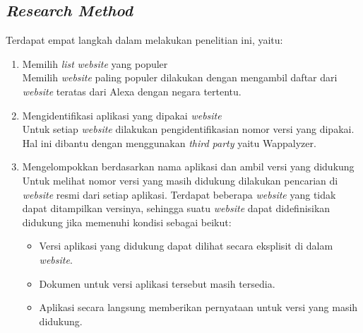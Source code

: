 \subsection{\textit{Research Method}}
Terdapat empat langkah dalam melakukan penelitian ini, yaitu:
\begin{enumerate}
    \item Memilih \textit{list} \textit{website} yang populer\\
    Memilih \textit{website} paling populer dilakukan dengan mengambil daftar dari \textit{website} teratas dari Alexa dengan negara tertentu.
    \item Mengidentifikasi aplikasi yang dipakai \textit{website}\\
    Untuk setiap \textit{website} dilakukan pengidentifikasian nomor versi yang dipakai. Hal ini dibantu dengan menggunakan \textit{third party} yaitu Wappalyzer. 
    \item Mengelompokkan berdasarkan nama aplikasi dan ambil versi yang didukung\\
    Untuk melihat nomor versi yang masih didukung dilakukan pencarian di \textit{website} resmi dari setiap aplikasi. Terdapat beberapa \textit{website} yang tidak dapat ditampilkan versinya, sehingga suatu \textit{website} dapat didefinisikan didukung jika memenuhi kondisi sebagai beikut:
    \begin{itemize}
        \item Versi aplikasi yang didukung dapat dilihat secara eksplisit di dalam \textit{website}.
        \item Dokumen untuk versi aplikasi tersebut masih tersedia.
        \item Aplikasi secara langsung memberikan pernyataan untuk versi yang masih didukung.
    \end{itemize}
    

\end{enumerate}
